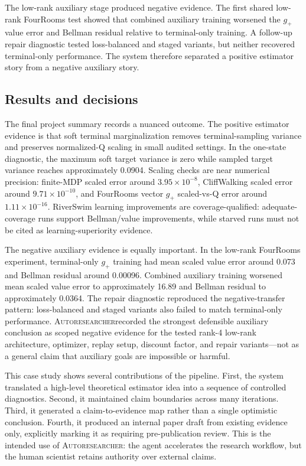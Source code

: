 \documentclass{article}
\newcommand{\sys}{\textsc{Autoresearcher}}
\begin{document}
The low-rank auxiliary stage produced negative evidence. The first shared low-rank FourRooms test showed that combined auxiliary training worsened the \(g_+\) value error and Bellman residual relative to terminal-only training. A follow-up repair diagnostic tested loss-balanced and staged variants, but neither recovered terminal-only performance. The system therefore separated a positive estimator story from a negative auxiliary story.

\subsection{Results and decisions}

The final project summary records a nuanced outcome. The positive estimator evidence is that soft terminal marginalization removes terminal-sampling variance and preserves normalized-Q scaling in small audited settings. In the one-state diagnostic, the maximum soft target variance is zero while sampled target variance reaches approximately 0.0904. Scaling checks are near numerical precision: finite-MDP scaled error around \(3.95\times 10^{-8}\), CliffWalking scaled error around \(9.71\times 10^{-10}\), and FourRooms vector \(g_+\) scaled-vs-Q error around \(1.11\times 10^{-16}\). RiverSwim learning improvements are coverage-qualified: adequate-coverage runs support Bellman/value improvements, while starved runs must not be cited as learning-superiority evidence.

The negative auxiliary evidence is equally important. In the low-rank FourRooms experiment, terminal-only \(g_+\) training had mean scaled value error around 0.073 and Bellman residual around 0.00096. Combined auxiliary training worsened mean scaled value error to approximately 16.89 and Bellman residual to approximately 0.0364. The repair diagnostic reproduced the negative-transfer pattern: loss-balanced and staged variants also failed to match terminal-only performance. \sys recorded the strongest defensible auxiliary conclusion as scoped negative evidence for the tested rank-4 low-rank architecture, optimizer, replay setup, discount factor, and repair variants---not as a general claim that auxiliary goals are impossible or harmful.

This case study shows several contributions of the pipeline. First, the system translated a high-level theoretical estimator idea into a sequence of controlled diagnostics. Second, it maintained claim boundaries across many iterations. Third, it generated a claim-to-evidence map rather than a single optimistic conclusion. Fourth, it produced an internal paper draft from existing evidence only, explicitly marking it as requiring pre-publication review. This is the intended use of \sys: the agent accelerates the research workflow, but the human scientist retains authority over external claims.
\end{document}
